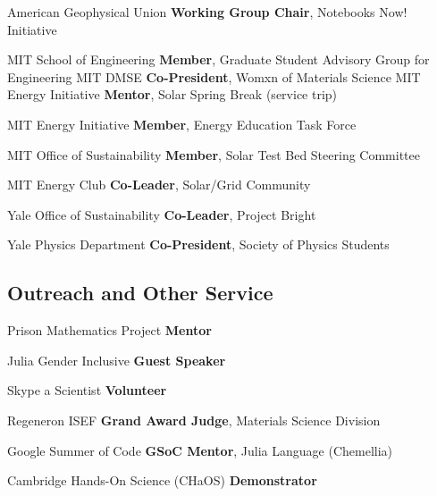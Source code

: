 {American Geophysical Union}
{\textbf{Working Group Chair}, Notebooks Now! Initiative}
{}

{MIT School of Engineering}
{\textbf{Member}, Graduate Student Advisory Group for Engineering}
{}
{MIT DMSE}
{\textbf{Co-President}, Womxn of Materials Science}
{}
{MIT Energy Initiative}
{\textbf{Mentor}, Solar Spring Break (service trip)}
{}

{MIT Energy Initiative}
{\textbf{Member}, Energy Education Task Force}
{}

{MIT Office of Sustainability}
{\textbf{Member}, Solar Test Bed Steering Committee}
{}

{MIT Energy Club}
{\textbf{Co-Leader}, Solar/Grid Community}
{}

{Yale Office of Sustainability}
{\textbf{Co-Leader}, Project Bright}
{}

{Yale Physics Department}
{\textbf{Co-President}, Society of Physics Students}
{}

\vspace{-2mm}
\subsection{Outreach and Other Service}
{Prison Mathematics Project}
{\textbf{Mentor}}
{}

{Julia Gender Inclusive}
{\textbf{Guest Speaker}}
{}

{Skype a Scientist}
{\textbf{Volunteer}}
{}

{Regeneron ISEF}
{\textbf{Grand Award Judge}, Materials Science Division}
{}

{Google Summer of Code}
{\textbf{GSoC Mentor}, Julia Language (Chemellia)}
{}

{Cambridge Hands-On Science (CHaOS)}
{\textbf{Demonstrator}}
{}
